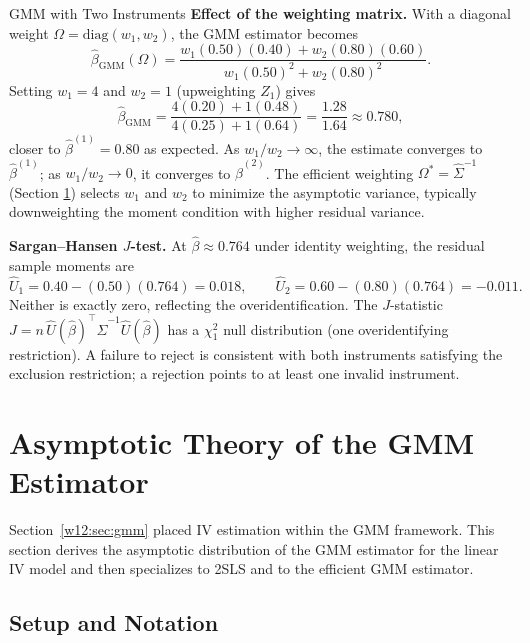 \documentclass[master.tex]{subfiles}
\begin{document}
\begin{example}{GMM with Two Instruments}
\textbf{Effect of the weighting matrix.}
With a diagonal weight $\Omega = \mathrm{diag}(w_1, w_2)$, the
GMM estimator becomes
\[
  \hat\beta_{\mathrm{GMM}}(\Omega)
  = \frac{w_1(0.50)(0.40) + w_2(0.80)(0.60)}
         {w_1(0.50)^2      + w_2(0.80)^2}.
\]
Setting $w_1 = 4$ and $w_2 = 1$ (upweighting $Z_1$) gives
\[
  \hat\beta_{\mathrm{GMM}}
  = \frac{4(0.20)+1(0.48)}{4(0.25)+1(0.64)}
  = \frac{1.28}{1.64}
  \approx 0.780,
\]
closer to $\hat\beta^{(1)} = 0.80$ as expected.  As
$w_1/w_2 \to \infty$, the estimate converges to $\hat\beta^{(1)}$;
as $w_1/w_2 \to 0$, it converges to $\hat\beta^{(2)}$.  The
efficient weighting $\Omega^\ast = \hat\Sigma^{-1}$ (Section
\ref{w12:sec:asymp}) selects $w_1$ and $w_2$ to minimize the
asymptotic variance, typically downweighting the moment condition
with higher residual variance.

\textbf{Sargan--Hansen $J$-test.}
At $\hat\beta \approx 0.764$ under identity weighting, the
residual sample moments are
\[
  \hat{U}_1 = 0.40 - (0.50)(0.764) = 0.018,
  \qquad
  \hat{U}_2 = 0.60 - (0.80)(0.764) = -0.011.
\]
Neither is exactly zero, reflecting the overidentification.  The
$J$-statistic $J = n\,\hat{U}(\hat\beta)^\top\hat\Sigma^{-1}\hat{U}(\hat\beta)$
has a $\chi^2_1$ null distribution (one overidentifying restriction).
A failure to reject is consistent with both instruments satisfying
the exclusion restriction; a rejection points to at least one
invalid instrument.
\end{example}


\section{Asymptotic Theory of the GMM Estimator}
\label{w12:sec:asymp}

Section~\ref{w12:sec:gmm} placed IV estimation within the GMM
framework.  This section derives the asymptotic distribution of the
GMM estimator for the linear IV model and then specializes to 2SLS
and to the efficient GMM estimator.

\subsection{Setup and Notation}
\end{document}

